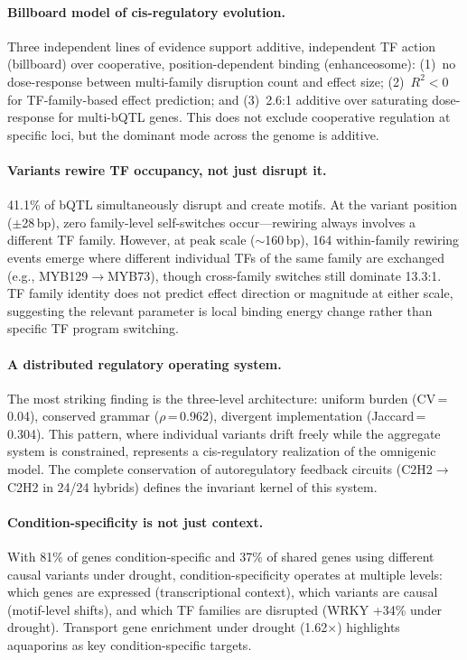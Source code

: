 \documentclass[11pt,a4paper]{article}
\begin{document}
\paragraph{Billboard model of cis-regulatory evolution.}
Three independent lines of evidence support additive, independent TF action
(billboard) over cooperative, position-dependent binding (enhanceosome):
(1)~no dose-response between multi-family disruption count and effect size;
(2)~$R^2 < 0$ for TF-family-based effect prediction; and (3)~2.6:1 additive
over saturating dose-response for multi-bQTL genes. This does not exclude
cooperative regulation at specific loci, but the dominant mode across the
genome is additive.

\paragraph{Variants rewire TF occupancy, not just disrupt it.}
41.1\% of bQTL simultaneously disrupt and create motifs. At the variant
position ($\pm$28\,bp), zero family-level self-switches occur---rewiring
always involves a different TF family. However, at peak scale
(${\sim}$160\,bp), 164 within-family rewiring events emerge where different
individual TFs of the same family are exchanged (e.g., MYB129$\to$MYB73),
though cross-family switches still dominate 13.3:1. TF family identity does
not predict effect direction or magnitude at either scale, suggesting the
relevant parameter is local binding energy change rather than specific TF
program switching.

\paragraph{A distributed regulatory operating system.}
The most striking finding is the three-level architecture: uniform burden
(CV\,=\,0.04), conserved grammar ($\rho$\,=\,0.962), divergent
implementation (Jaccard\,=\,0.304). This pattern, where individual variants
drift freely while the aggregate system is constrained, represents a
cis-regulatory realization of the omnigenic model. The complete conservation
of autoregulatory feedback circuits (C2H2$\to$C2H2 in 24/24 hybrids) defines
the invariant kernel of this system.

\paragraph{Condition-specificity is not just context.}
With 81\% of genes condition-specific and 37\% of shared genes using
different causal variants under drought, condition-specificity operates at
multiple levels: which genes are expressed (transcriptional context), which
variants are causal (motif-level shifts), and which TF families are disrupted
(WRKY +34\% under drought). Transport gene enrichment under drought
(1.62$\times$) highlights aquaporins as key condition-specific targets.
\end{document}
